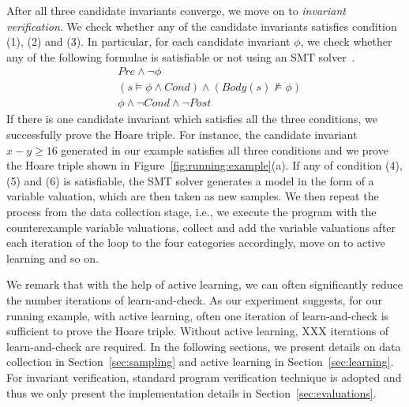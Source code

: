 After all three candidate invariants converge, we move on to \emph{invariant verification}. We check whether any of the candidate invariants satisfies condition (1), (2) and (3). In particular, for each candidate invariant $\phi$, we check whether any of the following formulae is satisfiable or not using an SMT solver~\cite{z3}.
\begin{align}
    & Pre \land \neg \phi \label{check:inv:pre} \\
    & (s \models \phi \land Cond) \land (Body(s) \not \models \phi) \label{check:inv:loop} \\
    & \phi \land \neg Cond \land \neg Post \label{check:inv:post}
\end{align}
If there is one candidate invariant which satisfies all the three conditions, we successfully prove the Hoare triple. For instance, the candidate invariant $x - y \geq 16$ generated in our example satisfies all three conditions and we prove the Hoare triple shown in Figure~\ref{fig:running:example}(a). If any of condition (4), (5) and (6) is satisfiable, the SMT solver generates a model in the form of a variable valuation, which are then taken as new samples. We then repeat the process from the data collection stage, i.e., we execute the program with the counterexample variable valuations, collect and add the variable valuations after each iteration of the loop to the four categories accordingly, move on to active learning and so on. 

We remark that with the help of active learning, we can often significantly reduce the number iterations of learn-and-check. As our experiment suggests, for our running example, with active learning, often one iteration of learn-and-check is sufficient to prove the Hoare triple. Without active learning, XXX iterations of learn-and-check are required. In the following sections, we present details on data collection in Section~\ref{sec:sampling} and active learning in Section~\ref{sec:learning}. For invariant verification, standard program verification technique is adopted and thus we only present the implementation details in Section~\ref{sec:evaluations}.




